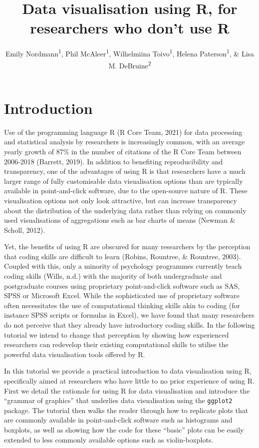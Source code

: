 \documentclass[
  english,
  doc,floatsintext]{apa6}
\title{Data visualisation using R, for researchers who don't use R}
\author{Emily Nordmann\textsuperscript{1}, Phil McAleer\textsuperscript{1}, Wilhelmiina Toivo\textsuperscript{1}, Helena Paterson\textsuperscript{1}, \& Lisa M. DeBruine\textsuperscript{2}}
\date{}
\affiliation{\vspace{0.5cm}\textsuperscript{1} School of Psychology, University of Glasgow\\\textsuperscript{2} Institute of Neuroscience and Psychology, University of Glasgow}
\begin{document}
\maketitle

\hypertarget{introduction}{%
\section{Introduction}\label{introduction}}

Use of the programming language R (R Core Team, 2021) for data processing and statistical analysis by researchers is increasingly common, with an average yearly growth of 87\% in the number of citations of the R Core Team between 2006-2018 (Barrett, 2019). In addition to benefiting reproducibility and transparency, one of the advantages of using R is that researchers have a much larger range of fully customisable data visualisation options than are typically available in point-and-click software, due to the open-source nature of R. These visualisation options not only look attractive, but can increase transparency about the distribution of the underlying data rather than relying on commonly used visualisations of aggregations such as bar charts of means (Newman \& Scholl, 2012).

Yet, the benefits of using R are obscured for many researchers by the perception that coding skills are difficult to learn (Robins, Rountree, \& Rountree, 2003). Coupled with this, only a minority of psychology programmes currently teach coding skills (Wills, n.d.) with the majority of both undergraduate and postgraduate courses using proprietary point-and-click software such as SAS, SPSS or Microsoft Excel. While the sophisticated use of proprietary software often necessitates the use of computational thinking skills akin to coding (for instance SPSS scripts or formulas in Excel), we have found that many researchers do not perceive that they already have introductory coding skills. In the following tutorial we intend to change that perception by showing how experienced researchers can redevelop their existing computational skills to utilise the powerful data visualisation tools offered by R.

In this tutorial we provide a practical introduction to data visualisation using R, specifically aimed at researchers who have little to no prior experience of using R. First we detail the rationale for using R for data visualisation and introduce the ``grammar of graphics'' that underlies data visualisation using the \texttt{ggplot2} package. The tutorial then walks the reader through how to replicate plots that are commonly available in point-and-click software such as histograms and boxplots, as well as showing how the code for these ``basic'' plots can be easily extended to less commonly available options such as violin-boxplots.
\end{document}
